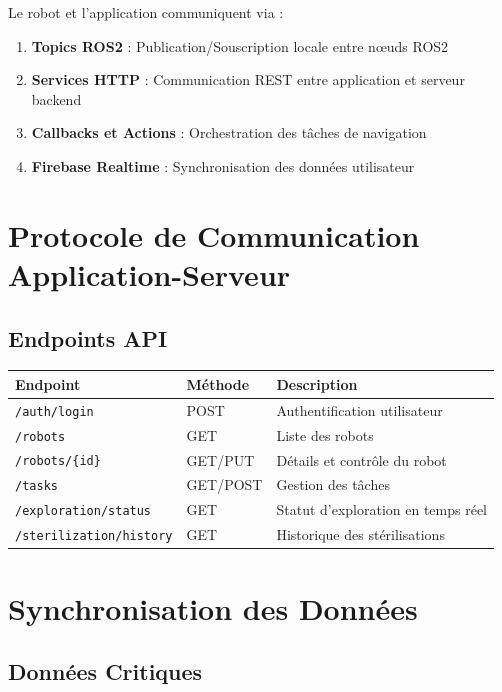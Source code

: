 \documentclass[12pt,a4paper,oneside]{report}
\begin{document}
Le robot et l'application communiquent via :

\begin{enumerate}
  \item \textbf{Topics ROS2} : Publication/Souscription locale entre nœuds ROS2
  \item \textbf{Services HTTP} : Communication REST entre application et serveur backend
  \item \textbf{Callbacks et Actions} : Orchestration des tâches de navigation
  \item \textbf{Firebase Realtime} : Synchronisation des données utilisateur
\end{enumerate}

\section{Protocole de Communication Application-Serveur}

\subsection{Endpoints API}

\begin{table}[H]
\centering
\begin{tabular}{|l|l|l|}
\hline
\textbf{Endpoint} & \textbf{Méthode} & \textbf{Description} \\
\hline
\texttt{/auth/login} & POST & Authentification utilisateur \\
\texttt{/robots} & GET & Liste des robots \\
\texttt{/robots/\{id\}} & GET/PUT & Détails et contrôle du robot \\
\texttt{/tasks} & GET/POST & Gestion des tâches \\
\texttt{/exploration/status} & GET & Statut d'exploration en temps réel \\
\texttt{/sterilization/history} & GET & Historique des stérilisations \\
\hline
\end{tabular}
\end{table}

\section{Synchronisation des Données}

\subsection{Données Critiques}
\end{document}
